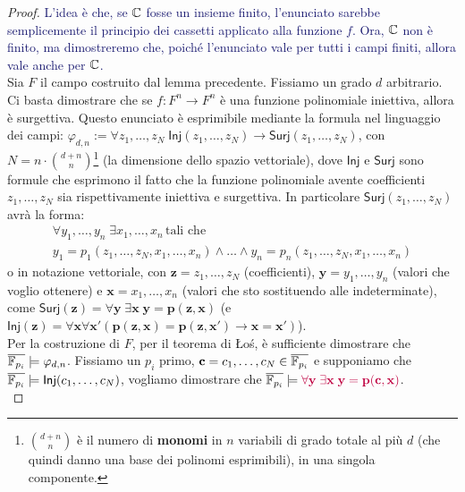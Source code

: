 \begin{proof}
    \textcolor{MidnightBlue}{L'idea è che, se $\mathbb C$ fosse un insieme finito, l'enunciato sarebbe semplicemente il principio dei cassetti applicato alla funzione $f$. Ora, $\mathbb C$ non è finito, ma dimostreremo che,
    poiché l'enunciato vale per tutti i campi finiti, allora vale anche per $\mathbb C$.}\\
    Sia $F$ il campo costruito dal lemma precedente. Fissiamo un grado $d$ arbitrario. Ci basta dimostrare che se $f : F^n \to F^n$ è una funzione polinomiale iniettiva, allora è surgettiva.
    Questo enunciato è esprimibile mediante la formula nel linguaggio dei campi: $\varphi_{d,n} := \forall z_1,\ldots,z_N \; \mathsf{Inj}(z_1,\ldots,z_N) \to \mathsf{Surj}(z_1,\ldots,z_N)$, con $N = n \cdot \binom{d+n}{n}$\footnote{$\binom{d+n}{n}$ è il numero di \textbf{monomi} in $n$ variabili di grado totale al più $d$ (che quindi danno una base dei polinomi esprimibili), in una singola componente.} (la dimensione dello spazio vettoriale),
    dove $\mathsf{Inj}$ e $\mathsf{Surj}$ sono formule che esprimono il fatto che la funzione polinomiale avente coefficienti $z_1,\ldots,z_N$ sia rispettivamente iniettiva e surgettiva. In particolare
    $\mathsf{Surj}(z_1,\ldots,z_N)$ avrà la forma:
    \begin{multline*}
            \forall y_1,\ldots,y_n \; \exists x_1,\ldots,x_n \, \text{tali che} \\
            y_1 = p_1(z_1,\ldots,z_N,x_1,\ldots,x_n) \land \ldots \land y_n = p_n(z_1,\ldots,z_N,x_1,\ldots,x_n)
    \end{multline*}
    o in notazione vettoriale, con $\mathbf{z} = z_1,\ldots,z_N$ (coefficienti), $\mathbf{y} = y_1,\ldots,y_n$ (valori che voglio ottenere) e $\mathbf{x} = x_1,\ldots,x_n$ (valori che sto sostituendo alle indeterminate), come $\mathsf{Surj}(\mathbf z) = \forall \mathbf{y} \; \exists \mathbf{x} \; \mathbf{y} = \mathbf{p}(\mathbf{z},\mathbf{x})$ (e $\mathsf{Inj}(\mathbf z) = \forall \mathbf{x} \forall \mathbf{x}' (\mathbf p(\mathbf{z},\mathbf{x}) = \mathbf{p}(\mathbf{z},\mathbf{x}') \to \mathbf{x} = \mathbf{x}')$).\\
    Per la costruzione di $F$, per il teorema di Łoś, è sufficiente dimostrare che $\overline{\mathbb F_{p_i}} \models \varphi_{d,n}$. Fissiamo un $p_i$ primo, $\mathbf c = c_1,\ldots,c_N \in \overline{\mathbb F_{p_i}}$ e supponiamo che $\overline{\mathbb F_{p_i}} \models \mathsf{Inj}(c_1,\ldots,c_N)$,
    vogliamo dimostrare che $\overline{\mathbb F_{p_i}} \models \textcolor{purple}{\forall \mathbf{y} \; \exists \mathbf{x} \; \mathbf{y} = \mathbf{p}(\mathbf{c},\mathbf{x})}$.\\

\end{proof}
